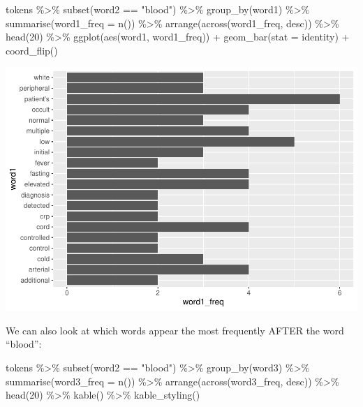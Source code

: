 \documentclass[
]{article}
\newenvironment{Shaded}{\begin{snugshade}}{\end{snugshade}}
\newcommand{\AttributeTok}[1]{\textcolor[rgb]{0.77,0.63,0.00}{#1}}
\newcommand{\DecValTok}[1]{\textcolor[rgb]{0.00,0.00,0.81}{#1}}
\newcommand{\FunctionTok}[1]{\textcolor[rgb]{0.00,0.00,0.00}{#1}}
\newcommand{\NormalTok}[1]{#1}
\newcommand{\SpecialCharTok}[1]{\textcolor[rgb]{0.00,0.00,0.00}{#1}}
\newcommand{\StringTok}[1]{\textcolor[rgb]{0.31,0.60,0.02}{#1}}
\begin{document}
\begin{Shaded}
\begin{Highlighting}[]
\NormalTok{tokens }\SpecialCharTok{\%\textgreater{}\%}
  \FunctionTok{subset}\NormalTok{(word2 }\SpecialCharTok{==} \StringTok{"blood"}\NormalTok{) }\SpecialCharTok{\%\textgreater{}\%}
  \FunctionTok{group\_by}\NormalTok{(word1) }\SpecialCharTok{\%\textgreater{}\%}
  \FunctionTok{summarise}\NormalTok{(}\AttributeTok{word1\_freq =} \FunctionTok{n}\NormalTok{()) }\SpecialCharTok{\%\textgreater{}\%}
  \FunctionTok{arrange}\NormalTok{(}\FunctionTok{across}\NormalTok{(word1\_freq, desc)) }\SpecialCharTok{\%\textgreater{}\%}
  \FunctionTok{head}\NormalTok{(}\DecValTok{20}\NormalTok{) }\SpecialCharTok{\%\textgreater{}\%}
  \FunctionTok{ggplot}\NormalTok{(}\FunctionTok{aes}\NormalTok{(word1, word1\_freq)) }\SpecialCharTok{+}
  \FunctionTok{geom\_bar}\NormalTok{(}\AttributeTok{stat =} \StringTok{\textquotesingle{}identity\textquotesingle{}}\NormalTok{) }\SpecialCharTok{+}
  \FunctionTok{coord\_flip}\NormalTok{()}
\end{Highlighting}
\end{Shaded}

\includegraphics{lab08-text-mining_files/figure-latex/unnamed-chunk-16-1.pdf}

We can also look at which words appear the most frequently AFTER the
word ``blood'':

\begin{Shaded}
\begin{Highlighting}[]
\NormalTok{tokens }\SpecialCharTok{\%\textgreater{}\%}
  \FunctionTok{subset}\NormalTok{(word2 }\SpecialCharTok{==} \StringTok{"blood"}\NormalTok{) }\SpecialCharTok{\%\textgreater{}\%}
  \FunctionTok{group\_by}\NormalTok{(word3) }\SpecialCharTok{\%\textgreater{}\%}
  \FunctionTok{summarise}\NormalTok{(}\AttributeTok{word3\_freq =} \FunctionTok{n}\NormalTok{()) }\SpecialCharTok{\%\textgreater{}\%}
  \FunctionTok{arrange}\NormalTok{(}\FunctionTok{across}\NormalTok{(word3\_freq, desc)) }\SpecialCharTok{\%\textgreater{}\%}
  \FunctionTok{head}\NormalTok{(}\DecValTok{20}\NormalTok{) }\SpecialCharTok{\%\textgreater{}\%}
  \FunctionTok{kable}\NormalTok{() }\SpecialCharTok{\%\textgreater{}\%}
  \FunctionTok{kable\_styling}\NormalTok{()}
\end{Highlighting}
\end{Shaded}
\end{document}
